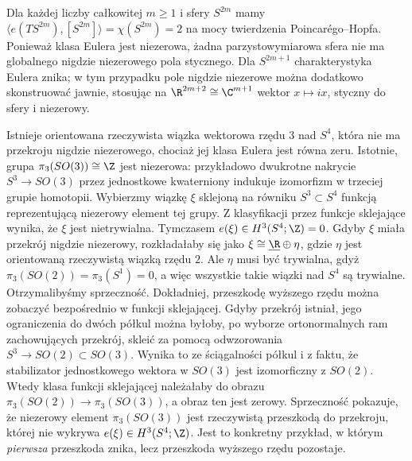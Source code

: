 \begin{przyklad}
Dla każdej liczby całkowitej $m\ge1$ i sfery $S^{2m}$ mamy
$\langle e(TS^{2m}),[S^{2m}]\rangle
=\chi(S^{2m})=2$ na mocy twierdzenia
Poincarégo--Hopfa. Ponieważ klasa Eulera jest niezerowa,
żadna parzystowymiarowa sfera nie ma globalnego
nigdzie niezerowego pola stycznego. Dla $S^{2m+1}$
charakterystyka Eulera znika; w tym przypadku pole
nigdzie niezerowe można dodatkowo skonstruować
jawnie, stosując na $\R^{2m+2}\cong\C^{m+1}$
wektor $x\mapsto ix$, styczny do sfery i niezerowy.
\end{przyklad}

\begin{przyklad}
Istnieje orientowana rzeczywista wiązka wektorowa rzędu
$3$ nad $S^4$, która nie ma przekroju nigdzie niezerowego,
chociaż jej klasa Eulera jest równa zeru.
Istotnie, grupa $\pi_3(SO(3))\cong\Z$ jest niezerowa:
przykładowo dwukrotne nakrycie $S^3\to SO(3)$
przez jednostkowe kwaterniony indukuje izomorfizm
w trzeciej grupie homotopii. Wybierzmy wiązkę $\xi$
sklejoną na równiku $S^3\subset S^4$ funkcją
reprezentującą niezerowy element tej grupy.
Z klasyfikacji przez funkcje sklejające wynika,
że $\xi$ jest nietrywialna. Tymczasem
$e(\xi)\in H^3(S^4;\Z)=0$.
Gdyby $\xi$ miała przekrój nigdzie niezerowy,
rozkładałaby się jako
$\xi\cong\underline\R\oplus\eta$,
gdzie $\eta$ jest orientowaną rzeczywistą wiązką
rzędu $2$. Ale $\eta$ musi być trywialna, gdyż
$\pi_3(SO(2))=\pi_3(S^1)=0$, a więc wszystkie
takie wiązki nad $S^4$ są trywialne.
Otrzymalibyśmy sprzeczność. Dokładniej, przeszkodę
wyższego rzędu można zobaczyć bezpośrednio w funkcji
sklejającej. Gdyby przekrój istniał, jego ograniczenia
do dwóch półkul można byłoby, po wyborze ortonormalnych
ram zachowujących przekrój, skleić za pomocą odwzorowania
$S^3\to SO(2)\subset SO(3)$. Wynika to ze ściągalności
półkul i z faktu, że stabilizator jednostkowego wektora
w $SO(3)$ jest izomorficzny z $SO(2)$. Wtedy klasa
funkcji sklejającej należałaby do obrazu
$\pi_3(SO(2))\to\pi_3(SO(3))$, a obraz ten jest zerowy.
Sprzeczność pokazuje, że niezerowy element
$\pi_3(SO(3))$ jest rzeczywistą przeszkodą do
przekroju, której nie wykrywa $e(\xi)\in H^3(S^4;\Z)$.
Jest to konkretny przykład, w którym \emph{pierwsza}
przeszkoda znika, lecz przeszkoda wyższego rzędu pozostaje.
\end{przyklad}

